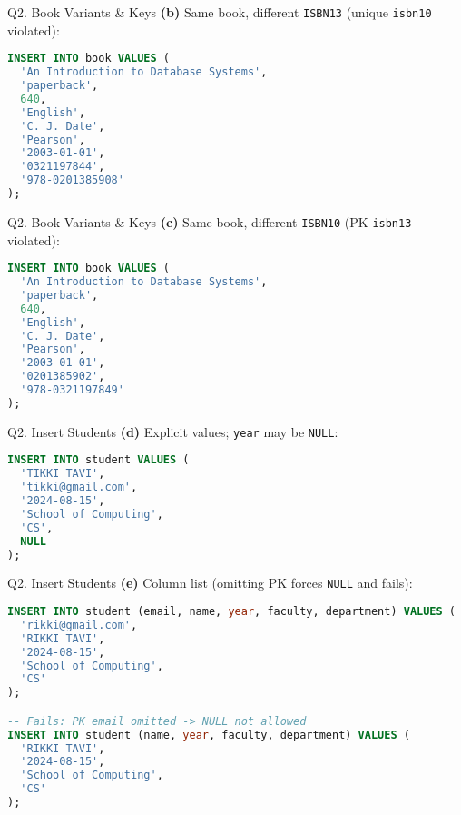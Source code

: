 \documentclass{beamer}
\begin{document}
\begin{frame}[fragile]{Q2. Book Variants \& Keys}
\textbf{(b)} Same book, different \texttt{ISBN13} (unique \texttt{isbn10} violated):
\begin{lstlisting}[language=SQL]
INSERT INTO book VALUES (
  'An Introduction to Database Systems',
  'paperback',
  640,
  'English',
  'C. J. Date',
  'Pearson',
  '2003-01-01',
  '0321197844',
  '978-0201385908'
);
\end{lstlisting}
\end{frame}

\begin{frame}[fragile]{Q2. Book Variants \& Keys}
\textbf{(c)} Same book, different \texttt{ISBN10} (PK \texttt{isbn13} violated):
\begin{lstlisting}[language=SQL]
INSERT INTO book VALUES (
  'An Introduction to Database Systems',
  'paperback',
  640,
  'English',
  'C. J. Date',
  'Pearson',
  '2003-01-01',
  '0201385902',
  '978-0321197849'
);
\end{lstlisting}
\end{frame}

\begin{frame}[fragile]{Q2. Insert Students}
\textbf{(d)} Explicit values; \texttt{year} may be \texttt{NULL}:
\begin{lstlisting}[language=SQL]
INSERT INTO student VALUES (
  'TIKKI TAVI',
  'tikki@gmail.com',
  '2024-08-15',
  'School of Computing',
  'CS',
  NULL
);
\end{lstlisting}
\end{frame}

\begin{frame}[fragile]{Q2. Insert Students}
\textbf{(e)} Column list (omitting PK forces \texttt{NULL} and fails):
\begin{lstlisting}[language=SQL]
INSERT INTO student (email, name, year, faculty, department) VALUES (
  'rikki@gmail.com',
  'RIKKI TAVI',
  '2024-08-15',
  'School of Computing',
  'CS'
);

-- Fails: PK email omitted -> NULL not allowed
INSERT INTO student (name, year, faculty, department) VALUES (
  'RIKKI TAVI',
  '2024-08-15',
  'School of Computing',
  'CS'
);
\end{lstlisting}
\end{frame}
\end{document}
